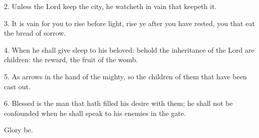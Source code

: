 
2. Unless the Lord keep the city, he watcheth in vain that keepeth it.

3. It is vain for you to rise before light, rise ye after you have rested, you that eat the bread of sorrow.

4. When he shall give sleep to his beloved: behold the inheritance of the Lord are children: the reward, the fruit of the womb.

5. As arrows in the hand of the mighty, so the children of them that have been cast out.

6. Blessed is the man that hath filled his desire with them;
he shall not be confounded when he shall speak to his enemies in the gate. 

Glory be.